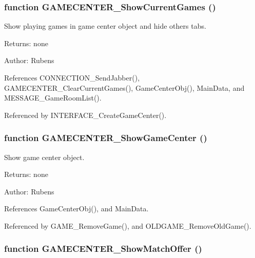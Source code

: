 \subsubsection[GAMECENTER\_\-ShowCurrentGames]{\setlength{\rightskip}{0pt plus 5cm}function GAMECENTER\_\-ShowCurrentGames ()}\label{gamecenter_2gamecenter_8js_dfe66d626e53964c9b02046dd63e6975}


Show playing games in game center object and hide others tabs. 

\begin{Desc}
\item[Returns:]none \end{Desc}
\begin{Desc}
\item[Author:]Rubens \end{Desc}


References CONNECTION\_\-SendJabber(), GAMECENTER\_\-ClearCurrentGames(), GameCenterObj(), MainData, and MESSAGE\_\-GameRoomList().

Referenced by INTERFACE\_\-CreateGameCenter().
\subsubsection[GAMECENTER\_\-ShowGameCenter]{\setlength{\rightskip}{0pt plus 5cm}function GAMECENTER\_\-ShowGameCenter ()}\label{gamecenter_2gamecenter_8js_d1bfb93ee54a5928e14320f094b269d0}


Show game center object. 

\begin{Desc}
\item[Returns:]none \end{Desc}
\begin{Desc}
\item[Author:]Rubens \end{Desc}


References GameCenterObj(), and MainData.

Referenced by GAME\_\-RemoveGame(), and OLDGAME\_\-RemoveOldGame().
\subsubsection[GAMECENTER\_\-ShowMatchOffer]{\setlength{\rightskip}{0pt plus 5cm}function GAMECENTER\_\-ShowMatchOffer ()}\label{gamecenter_2gamecenter_8js_58b864d58ec1400b476b489923e41e87}


